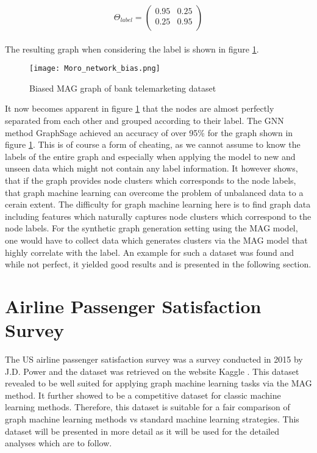   \[ \Theta_{label} = 
	\begin{pmatrix}
        0.95 & 0.25 \\
		0.25 & 0.95 \\
	\end{pmatrix}
	\] \\
  
  \noindent The resulting graph when considering the label is shown in figure
  \ref{fig:Moro_bias}.

  \begin{figure}[h]
		\centering
		\texttt{[image: Moro\_network\_bias.png]}
		\caption{Biased MAG graph of bank telemarketing dataset}
        \label{fig:Moro_bias}
  \end{figure}

  \noindent It now becomes apparent in figure \ref{fig:Moro_bias} that the
  nodes are almost perfectly separated from each other and grouped according to 
  their label. The GNN method GraphSage achieved an accuracy of over 95\% for 
  the graph shown in figure \ref{fig:Moro_bias}. This is of course a form of 
  cheating, as we cannot assume to know the labels of the entire graph and 
  especially when applying the model to new and unseen data which might not 
  contain any label information. It however shows, that if the graph provides 
  node clusters which corresponds to the node labels, that graph machine 
  learning can overcome the problem of unbalanced data to a cerain extent. 
  The difficulty for graph machine learning here is to find graph data including 
  features which naturally captures node clusters which correspond to the node 
  labels. For the synthetic graph generation setting using the MAG model, one 
  would have to collect data which generates clusters via the MAG model that 
  highly correlate with the label. An example for such a dataset was found and 
  while not perfect, it yielded good results and is presented in the following 
  section. 

  \section{Airline Passenger Satisfaction Survey}
  
  The US airline passenger satisfaction survey was a survey conducted in 2015
  by J.D. Power and the dataset was retrieved on the website Kaggle
  \citep{JDPower2015,KAGGLE2015}. This dataset revealed to be well suited for
  applying graph machine learning tasks via the MAG method. It further showed
  to be a competitive dataset for classic machine learning methods. Therefore,
  this dataset is suitable for a fair comparison of graph machine learning
  methods vs standard machine learning strategies. This dataset will be
  presented in more detail as it will be used for the detailed analyses which
  are to follow. \\

